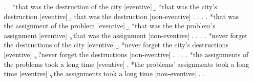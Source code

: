 \documentclass[12pt]{article}
\begin{document}
\ex. \label{pred1}
\a. *that was the destruction of the city \hfill [eventive]
\b. *that was the city's destruction \hfill [eventive]
\b. that was the destruction \hfill [non-eventive]
\z. \z. 
\ex. \label{pred2}
\a. *that was the assignment of the problem \hfill [eventive]
\b. *that was the the problem's assignment \hfill [eventive]
\c. that was the assignment \hfill [non-eventive]
\z. \z. 
\ex. \label{plur1}
\a. *never forget the destructions of the city \hfill [eventive]
\b. *never forget the city's destructions \hfill [eventive]
\c. ?never forget the destructions \hfill [non-eventive]
\z. \z. 
\ex. \label{plur2}
\a. *the assignments of the problems took a long time \hfill [eventive]
\b. *the problems' assignments took a long time \hfill [eventive]
\c. the assignments took a long time \hfill [non-eventive]
\z. \z. \par \par


\doublespacing
\end{document}
